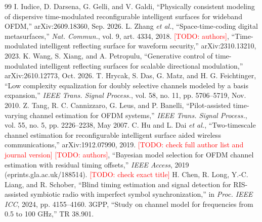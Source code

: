 \documentclass[journal]{IEEEtran}
\newcommand{\TODO}[1]{\textcolor{red}{[TODO: #1]}}
\begin{document}
\begin{thebibliography}{99}
 I. Iudice, D. Darsena, G. Gelli, and V. Galdi, ``Physically consistent modeling of dispersive time-modulated reconfigurable intelligent surfaces for wideband OFDM,'' arXiv:2609.18360, Sep. 2026.
 L. Zhang \emph{et al.}, ``Space-time-coding digital metasurfaces,'' \emph{Nat. Commun.}, vol. 9, art. 4334, 2018.
 \TODO{authors}, ``Time-modulated intelligent reflecting surface for waveform security,'' arXiv:2310.13210, 2023.
 K. Wang, S. Xiang, and A. Petropulu, ``Generative control of time-modulated intelligent reflecting surfaces for scalable directional modulation,'' arXiv:2610.12773, Oct. 2026.
 T. Hrycak, S. Das, G. Matz, and H. G. Feichtinger, ``Low complexity equalization for doubly selective channels modeled by a basis expansion,'' \emph{IEEE Trans. Signal Process.}, vol. 58, no. 11, pp. 5706--5719, Nov. 2010.
 Z. Tang, R. C. Cannizzaro, G. Leus, and P. Banelli, ``Pilot-assisted time-varying channel estimation for OFDM systems,'' \emph{IEEE Trans. Signal Process.}, vol. 55, no. 5, pp. 2226--2238, May 2007.
 C. Hu and L. Dai \emph{et al.}, ``Two-timescale channel estimation for reconfigurable intelligent surface aided wireless communications,'' arXiv:1912.07990, 2019. \TODO{check full author list and journal version}
 \TODO{authors}, ``Bayesian model selection for OFDM channel estimation with residual timing offsets,'' \emph{IEEE Access}, 2019 (eprints.gla.ac.uk/188514). \TODO{check exact title}
 H. Chen, R. Long, Y.-C. Liang, and R. Schober, ``Blind timing estimation and signal detection for RIS-assisted symbiotic radio with imperfect symbol synchronization,'' in \emph{Proc. IEEE ICC}, 2024, pp. 4155--4160.
 3GPP, ``Study on channel model for frequencies from 0.5 to 100 GHz,'' TR 38.901.
\end{thebibliography}
\end{document}
